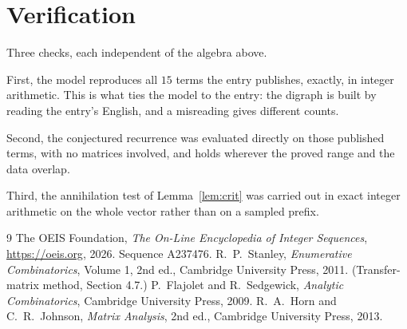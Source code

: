 \documentclass[11pt,a4paper]{article}
\theoremstyle{plain}
\theoremstyle{definition}
\begin{document}
\section{Verification}

Three checks, each independent of the algebra above.

First, the model reproduces all $15$ terms the entry publishes, exactly, in integer
arithmetic. This is what ties the model to the entry: the digraph is built by reading the
entry's English, and a misreading gives different counts.

Second, the conjectured recurrence was evaluated directly on those published terms, with no
matrices involved, and holds wherever the proved range and the data overlap.

Third, the annihilation test of Lemma~\ref{lem:crit} was carried out in exact integer
arithmetic on the whole vector rather than on a sampled prefix.

\begin{thebibliography}{9}
 The OEIS Foundation, \emph{The On-Line Encyclopedia of Integer
Sequences}, \url{https://oeis.org}, 2026. Sequence A237476.
 R.~P.~Stanley, \emph{Enumerative Combinatorics}, Volume 1, 2nd ed.,
Cambridge University Press, 2011. (Transfer-matrix method, Section 4.7.)
 P.~Flajolet and R.~Sedgewick, \emph{Analytic Combinatorics}, Cambridge
University Press, 2009.
 R.~A.~Horn and C.~R.~Johnson, \emph{Matrix Analysis}, 2nd ed., Cambridge
University Press, 2013.
\end{thebibliography}
\end{document}

